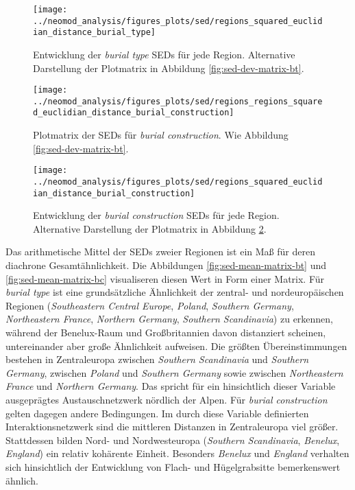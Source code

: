 \documentclass[openany,twoside,twocolumn]{book}
\begin{document}
\begin{figure}[!t]

{\centering \texttt{[image: ../neomod\_analysis/figures\_plots/sed/regions\_squared\_euclidian\_distance\_burial\_type]} 

}

\caption[Entwicklung der \textit{burial type} SEDs für jede Region]{Entwicklung der \textit{burial type} SEDs für jede Region. Alternative Darstellung der Plotmatrix in Abbildung \ref{fig:sed-dev-matrix-bt}.}\label{fig:sed-dev-bt}
\end{figure}

\begin{figure}
\texttt{[image: ../neomod\_analysis/figures\_plots/sed/regions\_regions\_squared\_euclidian\_distance\_burial\_construction]} \caption[Plotmatrix der SEDs für \textit{burial construction}]{Plotmatrix der SEDs für \textit{burial construction}. Wie Abbildung \ref{fig:sed-dev-matrix-bt}.}\label{fig:sed-dev-matrix-bc}
\end{figure}

\begin{figure}[!t]

{\centering \texttt{[image: ../neomod\_analysis/figures\_plots/sed/regions\_squared\_euclidian\_distance\_burial\_construction]} 

}

\caption[Entwicklung der \textit{burial construction} SEDs für jede Region]{Entwicklung der \textit{burial construction} SEDs für jede Region. Alternative Darstellung der Plotmatrix in Abbildung \ref{fig:sed-dev-matrix-bc}.}\label{fig:sed-dev-bc}
\end{figure}

Das arithmetische Mittel der SEDs zweier Regionen ist ein Maß für deren diachrone Gesamtähnlichkeit. Die Abbildungen \ref{fig:sed-mean-matrix-bt} und \ref{fig:sed-mean-matrix-bc} visualiseren diesen Wert in Form einer Matrix. Für \emph{burial type} ist eine grundsätzliche Ähnlichkeit der zentral- und nordeuropäischen Regionen (\emph{Southeastern Central Europe}, \emph{Poland}, \emph{Southern Germany}, \emph{Northeastern France}, \emph{Northern Germany}, \emph{Southern Scandinavia}) zu erkennen, während der Benelux-Raum und Großbritannien davon distanziert scheinen, untereinander aber große Ähnlichkeit aufweisen. Die größten Übereinstimmungen bestehen in Zentraleuropa zwischen \emph{Southern Scandinavia} und \emph{Southern Germany}, zwischen \emph{Poland} und \emph{Southern Germany} sowie zwischen \emph{Northeastern France} und \emph{Northern Germany}. Das spricht für ein hinsichtlich dieser Variable ausgeprägtes Austauschnetzwerk nördlich der Alpen. Für \emph{burial construction} gelten dagegen andere Bedingungen. Im durch diese Variable definierten Interaktionsnetzwerk sind die mittleren Distanzen in Zentraleuropa viel größer. Stattdessen bilden Nord- und Nordwesteuropa (\emph{Southern Scandinavia}, \emph{Benelux}, \emph{England}) ein relativ kohärente Einheit. Besonders \emph{Benelux} und \emph{England} verhalten sich hinsichtlich der Entwicklung von Flach- und Hügelgrabsitte bemerkenswert ähnlich.
\end{document}
